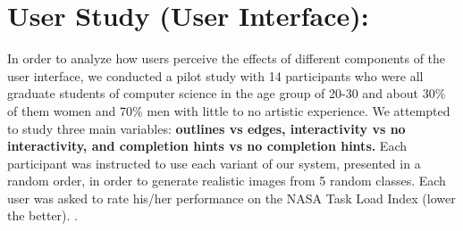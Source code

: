 \documentclass[10pt,twocolumn,letterpaper]{article}
\newcommand{\todo}[1]{\textbf{\textcolor[rgb]{.8, .1, .1}{#1}}}
\begin{document}
\author{
Arnab Ghosh$^{1}$ \hspace{8mm} Richard Zhang$^{2}$ \hspace{8mm} Puneet K. Dokania$^{1}$ \\
Oliver Wang$^{2}$ \hspace{8mm} Alexei A. Efros$^{2,3}$ \hspace{8mm} Philip H. S. Torr$^{1}$ \hspace{8mm} Eli Shechtman$^{2}$ \\
\\
$^{1}$University of Oxford \hspace{15mm} $^{2}$Adobe Research \hspace{15mm} $^{3}$UC Berkeley \\
}


\maketitle


\section{User Study (User Interface):}
In order to analyze how users perceive the effects of different components of the user interface, we conducted a pilot study with 14 participants who were all graduate students of computer science in the age group of 20-30 and about 30\% of them women and 70\% men with little to no artistic experience. 
We attempted to study three main variables: \textbf{outlines vs edges, interactivity vs no interactivity, and completion hints vs no completion hints.} 
Each participant was instructed to use each variant of our system, presented in a random order, in order to generate realistic images from 5 random classes. 
Each user was asked to rate his/her performance on the NASA Task Load Index (lower the better). \cite{hart1988development}. 
\end{document}
